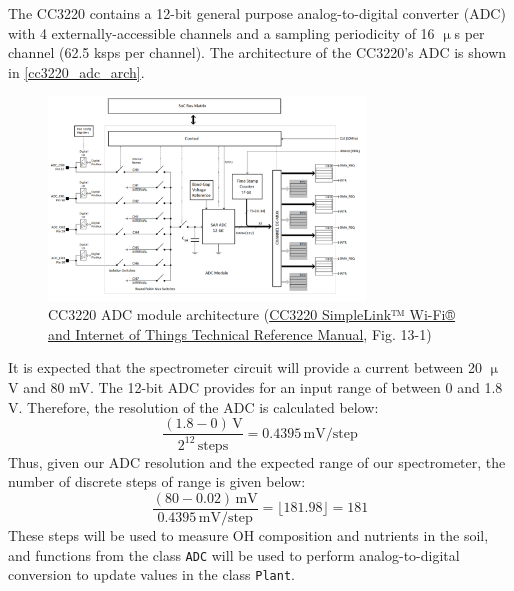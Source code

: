 \begin{flushleft}
    The CC3220 contains a 12-bit general purpose analog-to-digital converter
    (ADC) with 4 externally-accessible channels and a sampling periodicity of
    16 $\upmu$s per channel (62.5 ksps per channel). The architecture of the
    CC3220's ADC is shown in \autoref{cc3220_adc_arch}.
    \begin{figure}[H]
        \caption{CC3220 ADC module architecture (\href{https://www.ti.com/lit/ug/swru465/swru465.pdf}{CC3220 SimpleLink™ Wi-Fi® and Internet of Things Technical Reference Manual}, Fig. 13-1)}
        \label{cc3220_adc_arch}
        \centering
        \includegraphics[width=0.75\textwidth]{images/cc3220_adc_arch.png}
    \end{figure}
\end{flushleft}
\begin{flushleft}
    It is expected that the spectrometer circuit will provide a current
    between 20 $\upmu$V and 80 mV. The 12-bit ADC provides for an input range of
    between 0 and 1.8 V. Therefore, the resolution of the ADC is calculated
    below:
    \begin{equation}
        \label{eq:adc_res}
        \frac{(1.8 - 0)\,\mathrm{V}}{2^{12}\,\mathrm{steps}} =
        0.4395\,\mathrm{mV}/\mathrm{step}
    \end{equation}
    Thus, given our ADC resolution and the expected range of our spectrometer,
    the number of discrete steps of range is given below:
    \begin{equation}
        \label{eq:adc_steps}
        \frac{(80 - 0.02)\,\mathrm{mV}}{0.4395\,\mathrm{mV}/\mathrm{step}} =
        \lfloor181.98\rfloor = 181
    \end{equation}
    These steps will be used to measure OH composition and nutrients in the
    soil, and functions from the class \texttt{ADC} will be used to perform
    analog-to-digital conversion to update values in the class \texttt{Plant}.
\end{flushleft}
